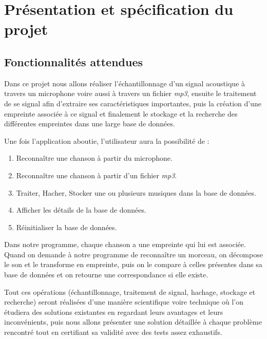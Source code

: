 \documentclass[10pt, english]{report}
\begin{document}
\chapter{Présentation et spécification du projet}
\section{Fonctionnalités attendues}
Dans ce projet nous allons réaliser l'échantillonnage d'un signal acoustique à travers un microphone voire aussi à travers un fichier \textit{mp3}, ensuite le traitement de se signal afin d'extraire ses caractéristiques importantes, puis la création d'une empreinte associée à ce signal et finalement le stockage et la recherche des différentes empreintes dans une large base de données.\\\par

Une fois l'application aboutie, l'utilisateur aura la possibilité de :\\

\begin{enumerate}
	\item Reconnaître une chanson à partir du microphone.
	\item Reconnaître une chanson à partir d'un fichier \textit{mp3}.
    \item Traiter, Hacher, Stocker une ou plusieurs musiques dans la base de données.
	\item Afficher les détails de la base de données.
	\item Réinitialiser la base de données.
\end{enumerate}

\vspace{0.5cm}
Dans notre programme, chaque chanson a une empreinte qui lui est associée. Quand on demande à notre programme de reconnaître un morceau, on décompose le son et le transforme en empreinte, puis on le compare à celles présentes dans sa base de données et on retourne une correspondance si elle existe.\\\par

Tout ces opérations (échantillonnage, traitement de signal, hachage, stockage et recherche) seront réalisées d'une manière scientifique voire technique où l'on étudiera des solutions existantes en regardant leurs avantages et leurs inconvénients, puis nous allons présenter une solution détaillée à chaque problème rencontré tout en certifiant sa validité avec des tests assez exhaustifs.
\end{document}
